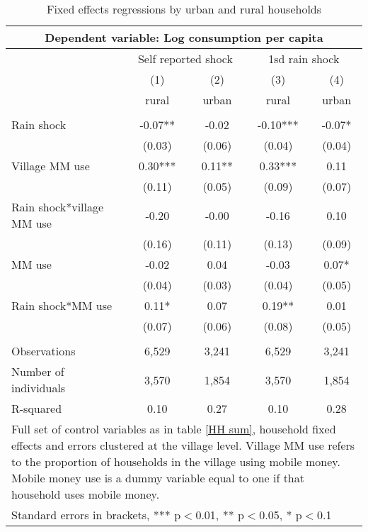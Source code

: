 \begin{table}
\centering
\caption{Fixed effects regressions by urban and rural  households} \label{urban rural}
\begin{tabular}{lcccc}
\multicolumn{5}{c}{Dependent variable: Log consumption per capita} \\ \hline
& \multicolumn{2}{c}{Self reported shock} & \multicolumn{2}{c}{1sd rain shock} \\
 & (1) & (2) & (3) & (4) \\
 & rural & urban& rural & urban  \\ \hline
 &  &  &  &  \\
Rain shock & -0.07** & -0.02 &   -0.10*** & -0.07*   \\
 & (0.03) & (0.06)  & (0.04) & (0.04)  \\
Village MM use & 0.30*** & 0.11** & 0.33*** & 0.11 \\
 & (0.11) & (0.05) & (0.09) & (0.07) \\
Rain shock*village MM use & -0.20 & -0.00 & -0.16 & 0.10  \\
 & (0.16) & (0.11) & (0.13) & (0.09)  \\
MM use & -0.02 & 0.04 & -0.03 & 0.07* \\
 & (0.04) & (0.03) & (0.04) & (0.05) \\
Rain shock*MM use & 0.11* & 0.07 & 0.19** & 0.01  \\
 & (0.07) & (0.06) & (0.08) & (0.05)  \\
 &  &  &  &  \\
Observations & 6,529 & 3,241 & 6,529 & 3,241 \\
Number of individuals & 3,570 & 1,854 & 3,570 & 1,854 \\
R-squared & 0.10 & 0.27 & 0.10 & 0.28 \\\hline
\multicolumn{5}{p{11cm}}{Full set of control variables as in table \ref{HH sum}, household fixed effects and errors clustered at the village level. Village MM use refers to the proportion of households in the village using mobile money. Mobile money use is a dummy variable equal to one if that household uses mobile money.} \\
\multicolumn{5}{l}{ Standard errors in brackets, *** p$<$0.01, ** p$<$0.05, * p$<$0.1} \\
\end{tabular}
\end{table}